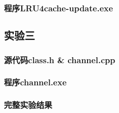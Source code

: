 \documentclass[UTF8,12pt]{article}
\begin{document}
\subsubsection{程序LRU4cache-update.exe}
\subsection{实验三}
\subsubsection{源代码class.h \& channel.cpp}
\subsubsection{程序channel.exe}
\subsubsection{完整实验结果}
\end{document}
